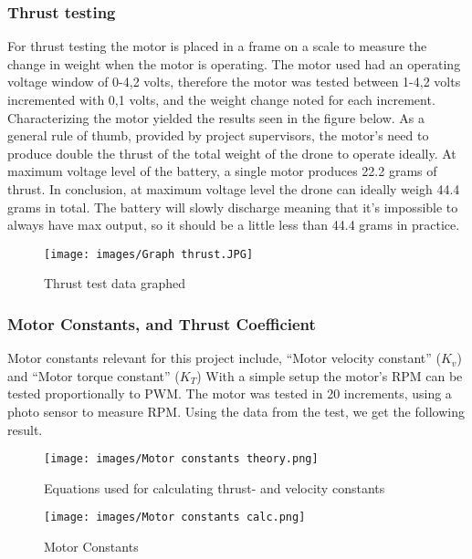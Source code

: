 \documentclass{article}
\begin{document}
\subsubsection{Thrust testing}

For thrust testing the motor is placed in a frame on a scale to measure the change in weight when the motor is operating. The motor used had an operating voltage window of 0-4,2 volts, therefore the motor was tested between 1-4,2 volts incremented with 0,1 volts, and the weight change noted for each increment. Characterizing the motor yielded the results seen in the figure below.
As a general rule of thumb, provided by project supervisors, the motor's need to produce double the thrust of the total weight of the drone to operate ideally.
At maximum voltage level of the battery, a single motor produces 22.2 grams of thrust. In conclusion, at maximum voltage level the drone can ideally weigh 44.4 grams in total. The battery will slowly discharge meaning that it's impossible to always have max output, so it should be a little less than 44.4 grams in practice.

\begin{figure}[H]
\begin{center}
   \texttt{[image: images/Graph thrust.JPG]}
\end{center}
\caption{Thrust test data graphed}
\end{figure}

\subsubsection{Motor Constants, and Thrust Coefficient}
Motor constants relevant for this project include, “Motor velocity constant” ($K_v$) and “Motor torque constant” ($K_T$)
With a simple setup the motor's RPM can be tested proportionally to PWM. The motor was tested in 20 increments, using a photo sensor to measure RPM. Using the data from the test, we get the following result. \cite{MotorConstants}

\begin{figure}[H]
\begin{center}
   \texttt{[image: images/Motor constants theory.png]}
\end{center}
\caption{Equations used for calculating thrust- and velocity constants}
\end{figure}

\begin{figure}[H]
\begin{center}
   \texttt{[image: images/Motor constants calc.png]}
\end{center}
\caption{Motor Constants}
\end{figure}
\end{document}
